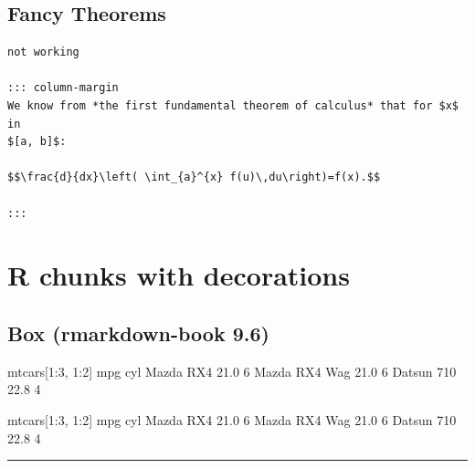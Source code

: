\documentclass[
]{report}
\newenvironment{Shaded}{\begin{snugshade}}{\end{snugshade}}
\newcommand{\DecValTok}[1]{\textcolor[rgb]{0.68,0.00,0.00}{#1}}
\newcommand{\FloatTok}[1]{\textcolor[rgb]{0.68,0.00,0.00}{#1}}
\newcommand{\NormalTok}[1]{\textcolor[rgb]{0.00,0.23,0.31}{#1}}
\newcommand{\SpecialCharTok}[1]{\textcolor[rgb]{0.37,0.37,0.37}{#1}}
\begin{document}
\subsection{Fancy Theorems}\label{fancy-theorems}

\begin{verbatim}
not working

::: column-margin
We know from *the first fundamental theorem of calculus* that for $x$ in
$[a, b]$:

$$\frac{d}{dx}\left( \int_{a}^{x} f(u)\,du\right)=f(x).$$

:::
\end{verbatim}

\section{R chunks with decorations}\label{r-chunks-with-decorations}

\subsection{Box (rmarkdown-book 9.6)}\label{box-rmarkdown-book-9.6}

\begin{Shaded}
\begin{Highlighting}[]
\NormalTok{mtcars[}\DecValTok{1}\SpecialCharTok{:}\DecValTok{3}\NormalTok{, }\DecValTok{1}\SpecialCharTok{:}\DecValTok{2}\NormalTok{]}
\NormalTok{               mpg cyl}
\NormalTok{Mazda RX4     }\FloatTok{21.0}   \DecValTok{6}
\NormalTok{Mazda RX4 Wag }\FloatTok{21.0}   \DecValTok{6}
\NormalTok{Datsun }\DecValTok{710}    \FloatTok{22.8}   \DecValTok{4}
\end{Highlighting}
\end{Shaded}

\begin{Shaded}
\begin{Highlighting}[]
\NormalTok{mtcars[}\DecValTok{1}\SpecialCharTok{:}\DecValTok{3}\NormalTok{, }\DecValTok{1}\SpecialCharTok{:}\DecValTok{2}\NormalTok{]}
\NormalTok{               mpg cyl}
\NormalTok{Mazda RX4     }\FloatTok{21.0}   \DecValTok{6}
\NormalTok{Mazda RX4 Wag }\FloatTok{21.0}   \DecValTok{6}
\NormalTok{Datsun }\DecValTok{710}    \FloatTok{22.8}   \DecValTok{4}
\end{Highlighting}
\end{Shaded}

\begin{center}\rule{0.5\linewidth}{0.5pt}\end{center}
\end{document}
